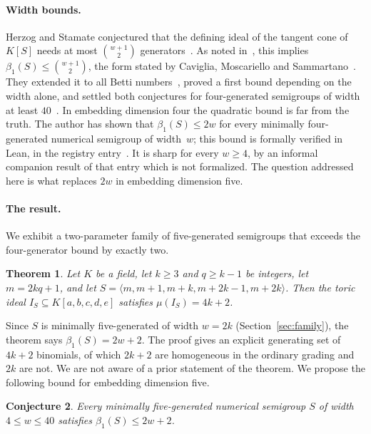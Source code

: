 \documentclass[11pt,letterpaper]{article}
\numberwithin{equation}{section}
\theoremstyle{plain}
\newtheorem{theorem}{Theorem}[section]
\newtheorem{conjecture}[theorem]{Conjecture}
\theoremstyle{remark}
\begin{document}
\paragraph{Width bounds.}
Herzog and Stamate conjectured that the defining ideal of the tangent cone of $K[S]$ needs at most $\binom{w+1}{2}$ generators~\cite[Conjecture~2.1]{HS14}. As noted in~\cite{CMS24}, this implies $\beta_1(S)\le\binom{w+1}{2}$, the form stated by Caviglia, Moscariello and Sammartano~\cite[Conjecture~1.2]{CMS24}. They extended it to all Betti numbers~\cite[Conjecture~1.3]{CMS24}, proved a first bound depending on the width alone, and settled both conjectures for four-generated semigroups of width at least $40$~\cite[Theorem~1.5]{CMS24}. In embedding dimension four the quadratic bound is far from the truth. The author has shown that $\beta_1(S)\le 2w$ for every minimally four-generated numerical semigroup of width~$w$; this bound is formally verified in Lean, in the registry entry~\cite{Palomar4gen}. It is sharp for every $w\ge 4$, by an informal companion result of that entry which is not formalized. The question addressed here is what replaces $2w$ in embedding dimension five.

\paragraph{The result.}
We exhibit a two-parameter family of five-generated semigroups that exceeds the four-generator bound by exactly two.

\begin{theorem}\label{thm:F}
Let $K$ be a field, let $k\ge 3$ and $q\ge k-1$ be integers, let $m=2kq+1$, and let $S=\langle m,m+1,m+k,m+2k-1,m+2k\rangle$. Then the toric ideal $I_S\subseteq K[a,b,c,d,e]$ satisfies $\mu(I_S)=4k+2$.
\end{theorem}

Since $S$ is minimally five-generated of width $w=2k$ (Section~\ref{sec:family}), the theorem says $\beta_1(S)=2w+2$. The proof gives an explicit generating set of $4k+2$ binomials, of which $2k+2$ are homogeneous in the ordinary grading and $2k$ are not. We are not aware of a prior statement of the theorem. We propose the following bound for embedding dimension five.

\begin{conjecture}\label{conj:W}
Every minimally five-generated numerical semigroup $S$ of width $4\le w\le 40$ satisfies $\beta_1(S)\le 2w+2$.
\end{conjecture}
\end{document}
